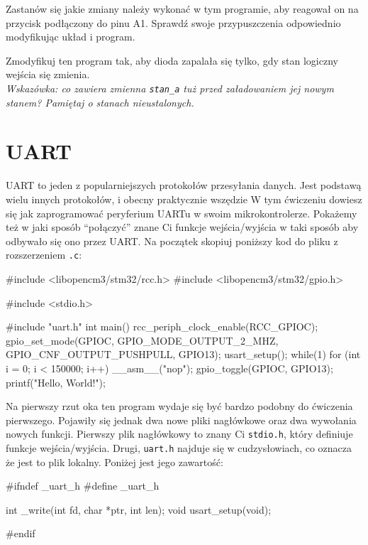 \documentclass{pdfBooklets}
\begin{document}
\begin{Zadanie}{}{}
  Zastanów się jakie zmiany należy wykonać w tym programie, aby reagował on na przycisk podłączony do pinu A1.
  Sprawdź swoje przypuszczenia odpowiednio modyfikując układ i program.
\end{Zadanie}

\begin{Zadanie}{}{}
  Zmodyfikuj ten program tak, aby dioda zapalała się tylko, gdy stan logiczny wejścia się zmienia.\\
  \textit{Wskazówka: co zawiera zmienna \texttt{\Verb$stan_a$} tuż przed załadowaniem jej nowym stanem? Pamiętaj
  o stanach nieustalonych.}
\end{Zadanie}

\section{UART}
UART to jeden z popularniejszych protokołów przesyłania danych. Jest podstawą wielu innych protokołów, i obecny praktycznie wszędzie
W tym ćwiczeniu dowiesz się jak zaprogramować peryferium UARTu w swoim mikrokontrolerze. Pokażemy też w jaki sposób ``połączyć'' znane Ci funkcje
wejścia/wyjścia w taki sposób aby odbywało się ono przez UART. Na początek skopiuj poniższy kod do pliku z rozszerzeniem \Verb$.c$:

\begin{CodeFrame*}[c]{}
#include <libopencm3/stm32/rcc.h>
#include <libopencm3/stm32/gpio.h>

#include <stdio.h>

#include "uart.h"
int main(){
  rcc_periph_clock_enable(RCC_GPIOC);
  gpio_set_mode(GPIOC, GPIO_MODE_OUTPUT_2_MHZ,
		GPIO_CNF_OUTPUT_PUSHPULL, GPIO13);
  usart_setup();
  while(1){
    for (int i = 0; i < 150000; i++) __asm__("nop");
    gpio_toggle(GPIOC, GPIO13);
    printf("Hello, World!\n");
  }
}
\end{CodeFrame*}

Na pierwszy rzut oka ten program wydaje się być bardzo podobny do ćwiczenia pierwszego. Pojawiły się jednak dwa nowe pliki nagłówkowe
oraz dwa wywołania nowych funkcji. Pierwszy plik nagłówkowy to znany Ci \Verb$stdio.h$, który definiuje funkcje wejścia/wyjścia. Drugi, \Verb$uart.h$
najduje się w cudzysłowiach, co oznacza że jest to plik lokalny. Poniżej jest jego zawartość:

\begin{CodeFrame*}[c]{}
#ifndef _uart_h
#define _uart_h

int _write(int fd, char *ptr, int len);
void usart_setup(void);

  
#endif
\end{CodeFrame*}
\end{document}
